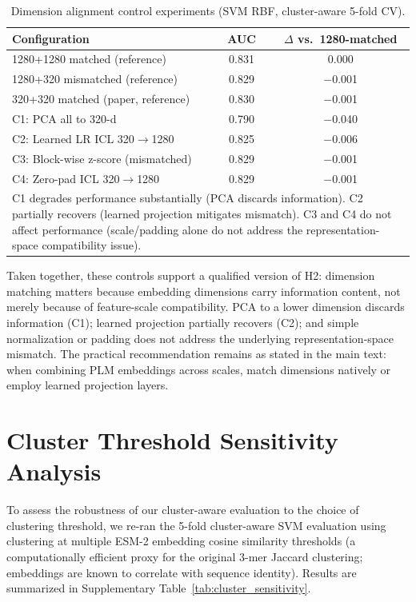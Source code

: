 \documentclass[11pt,a4paper]{article}
\begin{document}
\begin{table}[h!]
\centering
\caption{Dimension alignment control experiments (SVM RBF, cluster-aware 5-fold CV).}
\label{tab:dim_controls}
\begin{tabular}{lcc}
\toprule
Configuration & AUC & $\Delta$ vs.\ 1280-matched \\
\midrule
1280+1280 matched (reference)          & 0.831 & 0.000 \\
1280+320 mismatched (reference)        & 0.829 & $-$0.001 \\
320+320 matched (paper, reference)     & 0.830 & $-$0.001 \\
C1: PCA all to 320-d                   & 0.790 & $-$0.040 \\
C2: Learned LR ICL 320$\rightarrow$1280 & 0.825 & $-$0.006 \\
C3: Block-wise z-score (mismatched)    & 0.829 & $-$0.001 \\
C4: Zero-pad ICL 320$\rightarrow$1280  & 0.829 & $-$0.001 \\
\bottomrule
\multicolumn{3}{p{0.88\textwidth}}{\small C1 degrades performance substantially (PCA discards information). C2 partially recovers (learned projection mitigates mismatch). C3 and C4 do not affect performance (scale/padding alone do not address the representation-space compatibility issue).} \\
\end{tabular}
\end{table}

Taken together, these controls support a qualified version of H2: dimension matching matters because embedding dimensions carry information content, not merely because of feature-scale compatibility. PCA to a lower dimension discards information (C1); learned projection partially recovers (C2); and simple normalization or padding does not address the underlying representation-space mismatch. The practical recommendation remains as stated in the main text: when combining PLM embeddings across scales, match dimensions natively or employ learned projection layers.

\section{Cluster Threshold Sensitivity Analysis}

To assess the robustness of our cluster-aware evaluation to the choice of clustering threshold, we re-ran the 5-fold cluster-aware SVM evaluation using clustering at multiple ESM-2 embedding cosine similarity thresholds (a computationally efficient proxy for the original 3-mer Jaccard clustering; embeddings are known to correlate with sequence identity). Results are summarized in Supplementary Table~\ref{tab:cluster_sensitivity}.
\end{document}

